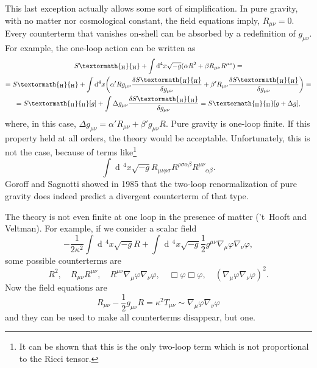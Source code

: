 \documentclass[a4paper,12pt]{book}
\newcommand{\ped}[1]{\textormath{\textsubscript{#1}}{_{\mathrm{#1}}}}
\newcommand{\dd}{\mathop{\mathrm{d}\!}{}}
\theoremstyle{definition}
\theoremstyle{remark}
\begin{document}
This last exception actually allows some sort of simplification. In pure gravity, with no matter nor cosmological constant, the field equations imply, $R_{\mu\nu}=0$. Every counterterm that vanishes on-shell can be absorbed by a redefinition of $g_{\mu\nu}$. For example, the one-loop action can be written as
\begin{multline*}
S\ped{H}+\int\dd^4x\sqrt{-g}(\alpha R^2+\beta R_{\mu\nu}R^{\mu\nu})=\\
=S\ped{H}+\int\dd^4x\biggl(\alpha'Rg_{\mu\nu}\frac{\delta S\ped{H}}{\delta g_{\mu\nu}}+\beta'R_{\mu\nu}\frac{\delta S\ped{H}}{\delta g_{\mu\nu}}\biggr)=\\
=S\ped{H}[g]+\int\Delta g_{\mu\nu}\frac{\delta S\ped{H}}{\delta g_{\mu\nu}}=S\ped{H}[g+\Delta g],
\end{multline*}
where, in this case, $\Delta g_{\mu\nu}=\alpha'R_{\mu\nu}+\beta'g_{\mu\nu}R$. Pure gravity is one-loop finite. If this property held at all orders, the theory would be acceptable. Unfortunately, this is not the case, because of terms like\footnote{It can be shown that this is the only two-loop term which is not proportional to the Ricci tensor.}
\[\int\dd^4x\sqrt{-g}R_{\mu\nu\rho\sigma}R^{\rho\sigma\alpha\beta}R^{\mu\nu}{}_{\alpha\beta}.\]
Goroff and Sagnotti showed in 1985 that the two-loop renormalization of pure gravity does indeed predict a divergent counterterm of that type.

The theory is not even finite at one loop in the presence of matter ('t~Hooft and Veltman). For example, if we consider a scalar field
\[-\frac1{2\kappa^2}\int\dd^4x\sqrt{-g}R+\int\dd^4x\sqrt{-g}\frac12g^{\mu\nu}\nabla_\mu\varphi\nabla_\nu\varphi,\]
some possible counterterms are
\[R^2,\quad R_{\mu\nu}R^{\mu\nu},\quad R^{\mu\nu}\nabla_\mu\varphi\nabla_\nu\varphi,\quad \Box\varphi\Box\varphi,\quad (\nabla_\mu\varphi\nabla_\nu\varphi)^2.\]
Now the field equations are
\[R_{\mu\nu}-\frac12g_{\mu\nu}R=\kappa^2T_{\mu\nu}\sim\nabla_\mu\varphi\nabla_\nu\varphi\]
and they can be used to make all counterterms disappear, but one.
\end{document}
